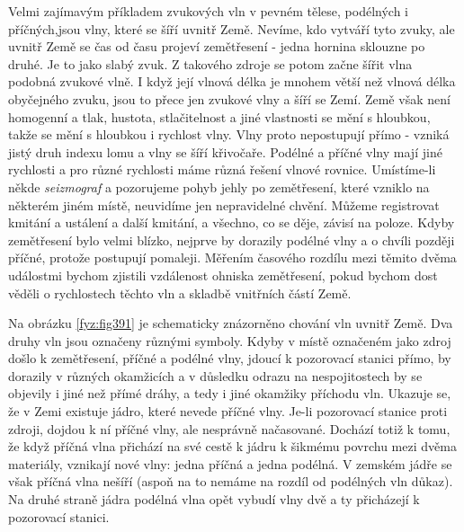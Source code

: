   Velmi zajímavým příkladem zvukových vln v pevném tělese, podélných i příčných,jsou vlny, které se 
  šíří uvnitř Země. Nevíme, kdo vytváří tyto zvuky, ale uvnitř Země se čas od času projeví 
  zemětřesení - jedna hornina sklouzne po druhé. Je to jako slabý zvuk. Z takového zdroje se potom 
  začne šířit vlna podobná zvukové vlně. I když její vlnová délka je mnohem větší než vlnová délka 
  obyčejného zvuku, jsou to přece jen zvukové vlny a šíří se Zemí. Země však není homogenní a tlak, 
  hustota, stlačitelnost a jiné vlastnosti se mění s hloubkou, takže se mění s hloubkou i rychlost 
  vlny. Vlny proto nepostupují přímo - vzniká jistý druh indexu lomu a vlny se šíří křivočaře. 
  Podélné a příčné vlny mají jiné rychlosti a pro různé rychlosti máme různá řešení vlnové rovnice. 
  Umístíme-li někde \emph{seizmograf} a pozorujeme pohyb jehly po zemětřesení, které vzniklo na 
  některém jiném místě, neuvidíme jen nepravidelné chvění. Můžeme registrovat kmitání a ustálení a 
  další kmitání, a všechno, co se děje, závisí na poloze. Kdyby zemětřesení bylo velmi blízko, 
  nejprve by dorazily podélné vlny a o chvíli později příčné, protože postupují pomaleji. Měřením 
  časového rozdílu mezi těmito dvěma událostmi bychom zjistili vzdálenost ohniska zemětřesení, 
  pokud bychom dost věděli o rychlostech těchto vln a skladbě vnitřních částí Země.
  
  Na obrázku \ref{fyz:fig391} je schematicky znázorněno chování vln uvnitř Země. Dva druhy vln jsou 
  označeny různými symboly. Kdyby v místě označeném jako zdroj došlo k zemětřesení, příčné a 
  podélné vlny, jdoucí k pozorovací stanici přímo, by dorazily v různých okamžicích a v důsledku 
  odrazu na nespojitostech by se objevily i jiné než přímé dráhy, a tedy i jiné okamžiky příchodu 
  vln. Ukazuje se, že v Zemi existuje jádro, které nevede příčné vlny. Je-li pozorovací stanice 
  proti zdroji, dojdou k ní příčné vlny, ale nesprávně načasované. Dochází totiž k tomu, že když 
  příčná vlna přichází na své cestě k jádru k šikmému povrchu mezi dvěma materiály, vznikají nové 
  vlny: jedna příčná a jedna podélná. V zemském jádře se však příčná vlna nešíří (aspoň na to 
  nemáme na rozdíl od podélných vln důkaz). Na druhé straně jádra podélná vlna opět vybudí vlny dvě 
  a ty přicházejí k pozorovací stanici.
  
